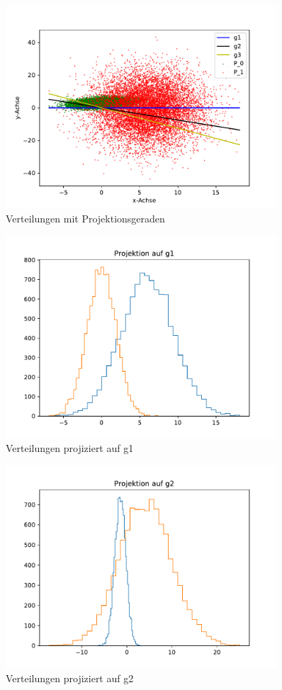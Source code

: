 \begin{figure}[H]
  \centering
  \includegraphics[width=0.9\textwidth]{13_a.pdf}
  \caption{Verteilungen mit Projektionsgeraden}
\end{figure}

\begin{figure}[H]
  \centering
  \includegraphics[width=0.9\textwidth]{13_P0_g1.pdf}
  \caption{Verteilungen projiziert auf g1}
\end{figure}


\begin{figure}[H]
  \centering
  \includegraphics[width=0.9\textwidth]{13_P0_g2.pdf}
  \caption{Verteilungen projiziert auf g2}
\end{figure}


